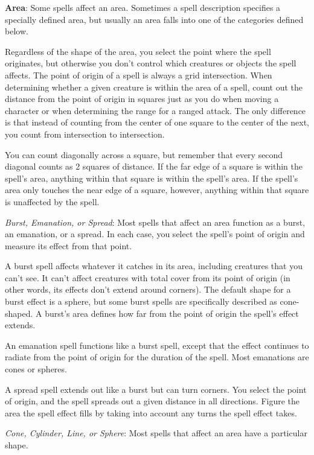 \textbf{Area}: Some spells affect an area. Sometimes a spell description specifies a specially defined area, but usually an area falls into one of the categories defined below.
				
Regardless of the shape of the area, you select the point where the spell originates, but otherwise you don't control which creatures or objects the spell affects. The point of origin of a spell is always a grid intersection. When determining whether a given creature is within the area of a spell, count out the distance from the point of origin in squares just as you do when moving a character or when determining the range for a ranged attack. The only difference is that instead of counting from the center of one square to the center of the next, you count from intersection to intersection.
				
You can count diagonally across a square, but remember that every second diagonal counts as 2 squares of distance. If the far edge of a square is within the spell's area, anything within that square is within the spell's area. If the spell's area only touches the near edge of a square, however, anything within that square is unaffected by the spell.
				
\textit{Burst, Emanation, or Spread}: Most spells that affect an area function as a burst, an emanation, or a spread. In each case, you select the spell's point of origin and measure its effect from that point.
				
A burst spell affects whatever it catches in its area, including creatures that you can't see. It can't affect creatures with total cover from its point of origin (in other words, its effects don't extend around corners). The default shape for a burst effect is a sphere, but some burst spells are specifically described as cone-shaped. A burst's area defines how far from the point of origin the spell's effect extends.
				
An emanation spell functions like a burst spell, except that the effect continues to radiate from the point of origin for the duration of the spell. Most emanations are cones or spheres.
				
A spread spell extends out like a burst but can turn corners. You select the point of origin, and the spell spreads out a given distance in all directions. Figure the area the spell effect fills by taking into account any turns the spell effect takes.
				
\textit{Cone, Cylinder, Line, or Sphere}: Most spells that affect an area have a particular shape.
				
